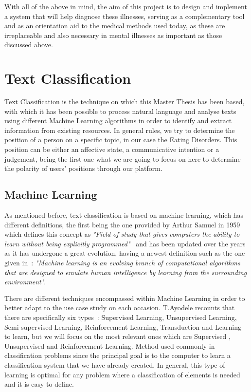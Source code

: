 With all of the above in mind, the aim of this project is to design and implement a system that will help diagnose these illnesses, serving as a complementary tool and as an orientation aid to the medical methods used today, as these are irreplaceable and also necessary in mental illnesses as important as those discussed above.



\section{Text Classification}
Text Classification is the technique on which this Master Thesis has been based, with which it has been possible to process natural language and analyse texts using different Machine Learning algorithms in order to identify and extract information from existing resources. In general rules, we try to determine the position of a person on a specific topic, in our case the Eating Disorders. This position can be either an affective state, a communicative intention or a judgement, being the first one what we are going to focus on here to determine the polarity of users' positions through our platform. 

\subsection{Machine Learning}
As mentioned before, text classification is based on machine learning, which has different definitions, the first being the one provided by Arthur Samuel in 1959 which defines this concept as \textit{"Field of study that gives computers the ability to learn without being explicitly programmed"}~\cite{samuel1959some} and has been updated over the years as it has undergone a great evolution, having a newest definition such as the one given in~\cite{el2015machine}: \textit{"Machine learning is an evolving branch of computational algorithms that are designed to emulate human intelligence by learning from the surrounding environment"}.

There are different techniques encompassed within Machine Learning in order to better adapt to the use case study on each occasion. T.Ayodele recounts that there are specifically six types~\cite{ayodele2010types}: Supervised Learning, Unsupervised Learning, Semi-supervised Learning,  Reinforcement Learning, Transduction and Learning to learn, but we will focus on the most relevant ones which are Supervised , Unsupervised and Reinforcement Learning.
Method used commonly in classification problems since the principal goal is to the computer to learn a classification system that we have already created. In general, this type of learning is optimal for any problem where a classification of elements is needed and it is easy to define. 

